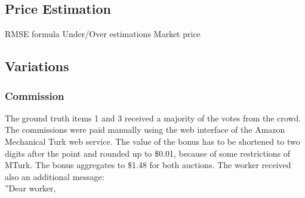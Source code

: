 \subsection{Price Estimation}
RMSE formula 
Under/Over estimations 
Market price 

\subsection{Variations}
\subsubsection{Commission }
The ground truth items 1 and 3 received a majority of the votes from the crowd. The commissions were paid manually using the web interface of the Amazon Mechanical Turk web service. The value of the bonus has to be shortened to two digits after the point and rounded up to \$0.01, because of some restrictions of MTurk. The bonus aggregates to \$1.48 for both auctions. The worker received also an additional message: \\
''Dear worker, \\

